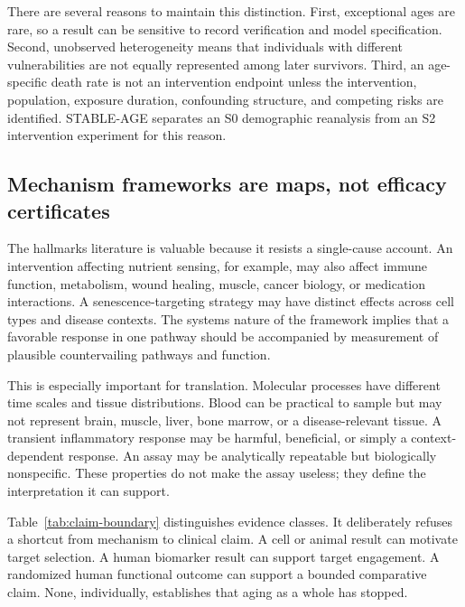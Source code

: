 \documentclass[10pt,conference]{IEEEtran}
\begin{document}
There are several reasons to maintain this distinction. First, exceptional ages are rare, so a result can be sensitive to record verification and model specification. Second, unobserved heterogeneity means that individuals with different vulnerabilities are not equally represented among later survivors. Third, an age-specific death rate is not an intervention endpoint unless the intervention, population, exposure duration, confounding structure, and competing risks are identified. STABLE-AGE separates an S0 demographic reanalysis from an S2 intervention experiment for this reason.

\subsection{Mechanism frameworks are maps, not efficacy certificates}

The hallmarks literature is valuable because it resists a single-cause account. An intervention affecting nutrient sensing, for example, may also affect immune function, metabolism, wound healing, muscle, cancer biology, or medication interactions. A senescence-targeting strategy may have distinct effects across cell types and disease contexts. The systems nature of the framework implies that a favorable response in one pathway should be accompanied by measurement of plausible countervailing pathways and function.

This is especially important for translation. Molecular processes have different time scales and tissue distributions. Blood can be practical to sample but may not represent brain, muscle, liver, bone marrow, or a disease-relevant tissue. A transient inflammatory response may be harmful, beneficial, or simply a context-dependent response. An assay may be analytically repeatable but biologically nonspecific. These properties do not make the assay useless; they define the interpretation it can support.

Table~\ref{tab:claim-boundary} distinguishes evidence classes. It deliberately refuses a shortcut from mechanism to clinical claim. A cell or animal result can motivate target selection. A human biomarker result can support target engagement. A randomized human functional outcome can support a bounded comparative claim. None, individually, establishes that aging as a whole has stopped.
\end{document}

